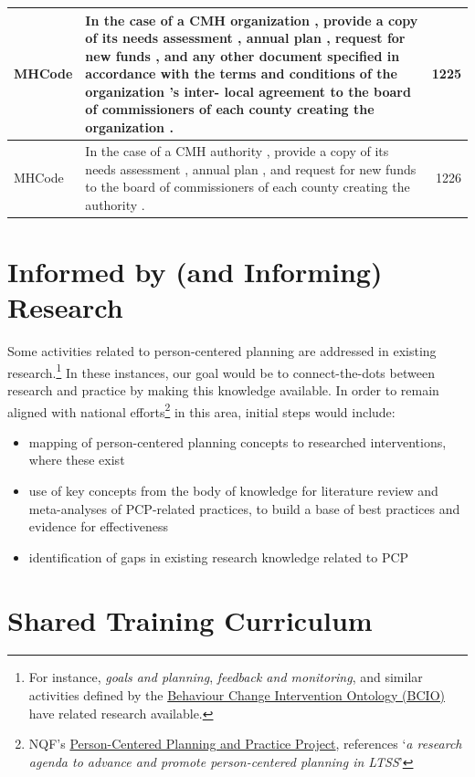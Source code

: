 \documentclass[
]{book}
\providecommand{\tightlist}{%
  \setlength{\itemsep}{0pt}\setlength{\parskip}{0pt}}
\begin{document}
\begin{tabular}{l|l|r}
\hline
MHCode & In the case of a CMH organization , provide a copy of its needs assessment , annual plan , request for new funds , and any other document specified in accordance with the terms and conditions of the organization 's inter- local agreement to the board of commissioners of each county creating the organization . & 1225\\
\hline
MHCode & In the case of a CMH authority , provide a copy of its needs assessment , annual plan , and request for new funds to the board of commissioners of each county creating the authority . & 1226\\
\hline
\end{tabular}

\hypertarget{research}{%
\chapter{Informed by (and Informing) Research}\label{research}}

Some activities related to person-centered planning are addressed in existing research.\footnote{For instance, \emph{goals and planning}, \emph{feedback and monitoring}, and similar activities defined by the \href{https://www.humanbehaviourchange.org/resources/behavioural-science/25/description}{Behaviour Change Intervention Ontology (BCIO)} have related research available.} In these instances, our goal would be to connect-the-dots between research and practice by making this knowledge available. In order to remain aligned with national efforts\footnote{NQF's \href{http://www.qualityforum.org/WorkArea/linkit.aspx?LinkIdentifier=id\&ItemID=91382}{Person-Centered Planning and Practice Project}, references `\emph{a research agenda to advance and promote person-centered planning in LTSS}'} in this area, initial steps would include:

\begin{itemize}
\tightlist
\item
  mapping of person-centered planning concepts to researched interventions, where these exist
\item
  use of key concepts from the body of knowledge for literature review and meta-analyses of PCP-related practices, to build a base of best practices and evidence for effectiveness
\item
  identification of gaps in existing research knowledge related to PCP
\end{itemize}

\hypertarget{curriculum}{%
\chapter{Shared Training Curriculum}\label{curriculum}}
\end{document}
